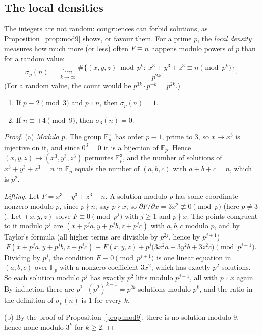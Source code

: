 \subsection*{The local densities}

The integers are not random: congruences can forbid solutions, as Proposition~\ref{prop:mod9} shows, or favour them. For a prime $p$, the \emph{local density} measures how much more (or less) often
$F\equiv n$ happens modulo powers of $p$ than for a random value:
\[
\sigma_p(n)=\lim_{k\to\infty}\frac{\#\{(x,y,z)\bmod p^k:\ x^3+y^3+z^3\equiv n\pmod{p^k}\}}{p^{2k}}.
\]
(For a random value, the count would be $p^{3k}\cdot p^{-k}=p^{2k}$.)

\begin{proposition}\label{prop:localdens}
\begin{enumerate}[label=(\alph*)]
\item If $p\equiv2\pmod3$ and $p\nmid n$, then $\sigma_p(n)=1$.
\item If $n\equiv\pm4\pmod9$, then $\sigma_3(n)=0$.
\end{enumerate}
\end{proposition}

\begin{proof}
(a) \emph{Modulo $p$.} The group $\mathbb F_p^\times$ has order $p-1$, prime to $3$, so $x\mapsto x^3$ is injective on it, and since $0^3=0$ it is a bijection of $\mathbb F_p$. Hence $(x,y,z)\mapsto(x^3,y^3,z^3)$ permutes $\mathbb F_p^3$, and
the number of solutions of $x^3+y^3+z^3=n$ in $\mathbb F_p$ equals the number of $(a,b,c)$ with $a+b+c=n$, which is $p^2$.

\emph{Lifting.} Let $F=x^3+y^3+z^3-n$. A solution modulo $p$ has some coordinate nonzero modulo $p$, since $p\nmid n$; say $p\nmid x$, so $\partial F/\partial x=3x^2\not\equiv0\pmod p$ (here $p\ne3$). Let $(x,y,z)$
solve $F\equiv0\pmod{p^j}$ with $j\ge1$ and $p\nmid x$. The points congruent to it modulo $p^j$ are $(x+p^ja,y+p^jb,z+p^jc)$ with $a,b,c$ modulo $p$, and by Taylor's formula (all higher terms are
divisible by $p^{2j}$, hence by $p^{j+1}$)
\[
F(x+p^ja,y+p^jb,z+p^jc)\equiv F(x,y,z)+p^j\bigl(3x^2a+3y^2b+3z^2c\bigr)\pmod{p^{j+1}}.
\]
Dividing by $p^j$, the condition $F\equiv0\pmod{p^{j+1}}$ is one linear equation in $(a,b,c)$ over $\mathbb F_p$ with a nonzero coefficient $3x^2$, which has exactly $p^2$ solutions. So each solution modulo $p^j$ has exactly $p^2$
lifts modulo $p^{j+1}$, all with $p\nmid x$ again. By induction there are $p^2\cdot(p^2)^{k-1}=p^{2k}$ solutions modulo $p^k$, and the ratio in the definition of $\sigma_p(n)$ is $1$ for every $k$.

(b) By the proof of Proposition~\ref{prop:mod9}, there is no solution modulo $9$, hence none modulo $3^k$ for $k\ge2$.
\end{proof}

